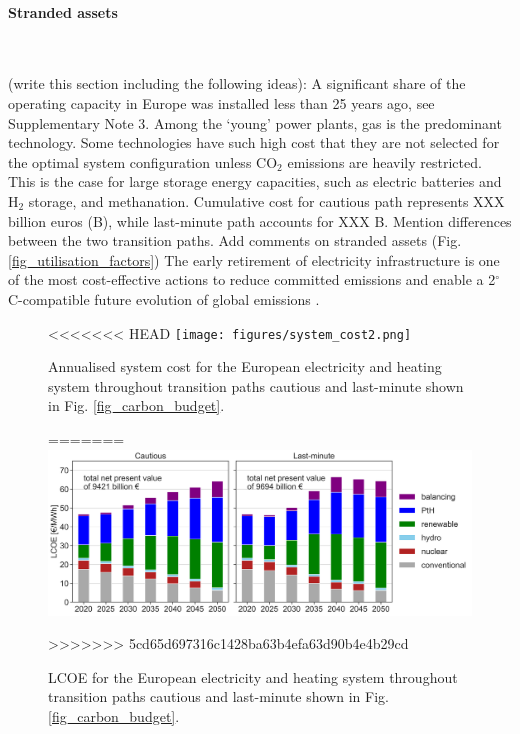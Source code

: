 \documentclass[5p]{elsarticle} %
\begin{document}
\paragraph{\textbf{Stranded assets}} \

(write this section including the following ideas): A significant share of the operating capacity in Europe was installed less than 25 years ago, see Supplementary Note 3. Among the `young' power plants, gas is the predominant technology.
Some technologies have such high cost that they are not selected for the optimal system configuration unless CO$_2$ emissions are heavily restricted. This is the case for large storage energy capacities, such as electric batteries and H$_2$ storage, and methanation. Cumulative cost for cautious path represents XXX billion euros (B\EUR), while last-minute path accounts for XXX B\EUR. Mention differences between the two transition paths. Add comments on stranded assets (Fig. \ref{fig_utilisation_factors})
The early retirement of electricity infrastructure is one of the most cost-effective actions to reduce committed emissions and enable a 2$^{\circ}$C-compatible future evolution of global emissions \cite{Tong_2019}.

\begin{figure}[!h]
\centering
<<<<<<< HEAD
\texttt{[image: figures/system\_cost2.png]}
\caption{Annualised system cost for the European electricity and heating system throughout transition paths cautious and last-minute shown in Fig. \ref{fig_carbon_budget}.} \label{fig_system_cost} 
=======
\includegraphics[width=12cm]{figures/LCOE.png}
\caption{LCOE for the European electricity and heating system throughout transition paths cautious and last-minute shown in Fig. \ref{fig_carbon_budget}.} \label{fig_system_cost} 
>>>>>>> 5cd65d697316c1428ba63b4efa63d90b4e4b29cd
\end{figure}
\end{document}
